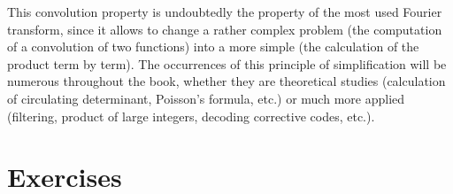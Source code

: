  This convolution property is undoubtedly the property of the most used Fourier transform, since it allows to change a rather complex problem (the computation of a convolution of two functions) into a more simple (the calculation of the product term by term). The occurrences of this principle of simplification will be numerous throughout the book, whether they are theoretical studies (calculation of circulating determinant, Poisson's formula, etc.) or much more applied (filtering, product of large integers, decoding corrective codes, etc.).
\section{Exercises}
\label{sect1-chap1-exercises}

